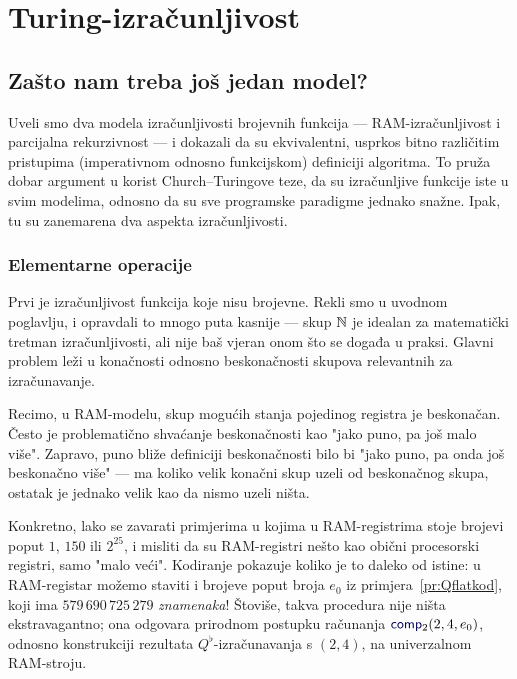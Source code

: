 \chapter{Turing-izračunljivost}

\section{Zašto nam treba još jedan model?}

Uveli smo dva modela izračunljivosti brojevnih funkcija --- RAM-izračunljivost i parcijalna rekurzivnost --- i dokazali da su ekvivalentni, usprkos bitno različitim pristupima (imperativnom odnosno funkcijskom) definiciji algoritma. To pruža dobar argument u korist Church--\!Turingove teze, da su izračunljive funkcije iste u svim modelima, odnosno da su sve programske paradigme jednako snažne. Ipak, tu su zanemarena dva aspekta izračunljivosti.

\subsection{Elementarne operacije}

Prvi je izračunljivost funkcija koje nisu brojevne. Rekli smo u uvodnom poglavlju, i opravdali to mnogo puta kasnije --- skup ${\mathbb N}$ je idealan za matematički tretman izračunljivosti, ali nije baš vjeran onom što se događa u praksi. Glavni problem leži u konačnosti odnosno beskonačnosti skupova relevantnih za izračunavanje.

Recimo, u RAM-modelu, skup mogućih stanja pojedinog registra je beskonačan. Često je problematično shvaćanje beskonačnosti kao "jako puno, pa još malo više". Zapravo, puno bliže definiciji beskonačnosti bilo bi "jako puno, pa onda još beskonačno više" --- ma koliko velik konačni skup uzeli od beskonačnog skupa, ostatak je jednako velik kao da nismo uzeli ništa.

Konkretno, lako se zavarati primjerima u kojima u RAM-registrima stoje brojevi poput $1$, $150$ ili $2^{25}$, i misliti da su RAM-registri nešto kao obični procesorski registri, samo "malo veći". Kodiranje pokazuje koliko je to daleko od istine: u RAM-registar možemo staviti i brojeve poput broja $e_0$ iz primjera~\ref{pr:Qflatkod}, koji ima $579\,690\,725\,279$ \emph{znamenaka}! Štoviše, takva procedura nije ništa ekstravagantno; ona odgovara prirodnom postupku računanja $\f{comp}_2(2,4,e_0)$, odnosno konstrukciji rezultata $Q^\flat$-izračunavanja s $(2,4)$, na univerzalnom RAM-stroju.

